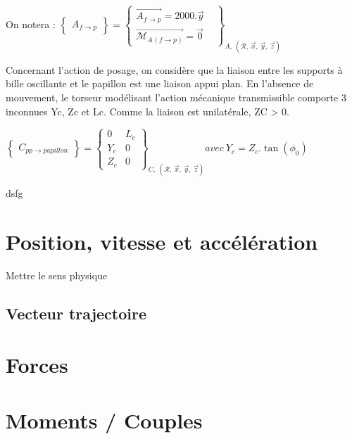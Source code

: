 \documentclass[
	11pt, %
	fleqn, %
	a4paper, %
]{LegrandOrangeBook}
\begin{document}
\begin{Extrait}
\begin{minipage}{0.4\textwidth}
\end{minipage}


On notera :
$\displaystyle \begin{Bmatrix}
A_{f\rightarrow p}
\end{Bmatrix} =\begin{Bmatrix}
\overrightarrow{A_{f\rightarrow p}} =2000.\vec{y} & \\
\overrightarrow{\mathcal{M}_{A}{}_{\left( f\rightarrow p\right)}} =\vec{0} & 
\end{Bmatrix}_{A,\ (\mathcal{R} ,\ \vec{x} ,\ \vec{y} ,\ \vec{z})}$

Concernant l’action de posage, on considère que la liaison entre les supports à bille
oscillante et le papillon est une liaison appui plan. En l’absence de mouvement, le
torseur modélisant l’action mécanique transmissible comporte 3 inconnues Yc, Zc et Lc.
Comme la liaison est unilatérale, ZC > 0.

$\displaystyle \begin{Bmatrix}
C_{pp\rightarrow papillon}
\end{Bmatrix} =\begin{Bmatrix}
0 & L_{c}\\
Y_{c} & 0\\
Z_{c} & 0
\end{Bmatrix}_{C,\ (\mathcal{R} ,\ \vec{x} ,\ \vec{y} ,\ \vec{z})} avec\ Y_{c} =Z_{c} .\tan( \phi_{0})$


\end{Extrait}

\begin{Exercice}
    dsfg
\end{Exercice}




\section{Position, vitesse et accélération}
Mettre le sens physique
\subsection{Vecteur trajectoire}

\section{Forces}

\section{Moments / Couples}
\end{document}
